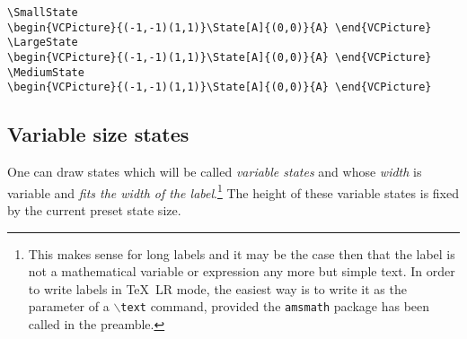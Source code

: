 \documentclass[11pt,twoside]{article}
\newlength{\parindenttemp} %
\newcommand{\smallskipneg}{\vspace*{-1ex}} %
\newcommand{\noi}{\noindent}
\newcommand{\e}{\text{\quad}}                 %
\newlength{\jsIndent}%
\newlength{\ColSource}%
\newlength{\ColFigur}%
\begin{document}
\noi 
\hspace*{-\jsIndent}
\begin{minipage}[c]{\ColFigur-.7cm}%
\par\vspace*{0mm}%
\begin{center}
        \SmallState
{}\e 
\LargeState
{}\e 
\MediumState
{}
\end{center}
\end{minipage}%
\hspace*{1.2em}%
\begin{minipage}[c]{\ColSource+.7cm}
\setlength{\parindent}{\parindenttemp}%
\par\vspace*{0mm}%
\footnotesize
\begin{verbatim}
\SmallState
\begin{VCPicture}{(-1,-1)(1,1)}\State[A]{(0,0)}{A} \end{VCPicture}
\LargeState
\begin{VCPicture}{(-1,-1)(1,1)}\State[A]{(0,0)}{A} \end{VCPicture}
\MediumState
\begin{VCPicture}{(-1,-1)(1,1)}\State[A]{(0,0)}{A} \end{VCPicture}
\end{verbatim}
\normalsize
\end{minipage}%
\HideFrame

\subsection{Variable size states}\label{subsec.varst}
\noi
One can draw states which will be called \emph{variable states} and whose 
\emph{width} is variable and \emph{fits the width of the 
label}.\footnote{%
   This makes sense for long labels and it may be the case then that 
   the label is not a mathematical variable or expression any more 
   but simple text.
   In order to write labels in \TeX\ LR mode, the easiest way is to 
   write it as the parameter of a $\backslash$\texttt{text} command, 
   provided the \texttt{amsmath} package has been called in the 
   preamble.}
The height of
these variable states is fixed by the current preset state size.
\end{document}
